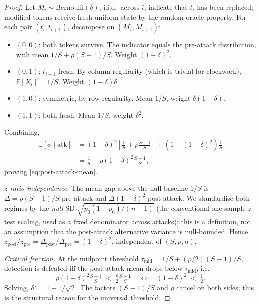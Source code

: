 \begin{proof}
  Let $M_i \sim \mathrm{Bernoulli}(\delta)$, i.i.d.\ across $i$,
  indicate that $t_i$ has been replaced; modified tokens receive
  fresh uniform state by the random-oracle property.  For each pair
  $(t_i, t_{i+1})$, decompose on $(M_i, M_{i+1})$:

  \begin{itemize}[nosep, leftmargin=1.2em]
    \item $(0,0)$: both tokens survive.  The indicator equals the
      pre-attack distribution, with mean $1/S + \rho (S{-}1)/S$.
      Weight $(1-\delta)^2$.
    \item $(0,1)$: $t_{i+1}$ fresh.  By column-regularity (which is
      trivial for clockwork), $\mathbb{E}[X_i] = 1/S$.  Weight
      $(1-\delta)\delta$.
    \item $(1,0)$: symmetric, by row-regularity.  Mean $1/S$, weight
      $\delta(1-\delta)$.
    \item $(1,1)$: both fresh.  Mean $1/S$, weight $\delta^2$.
  \end{itemize}
  Combining,
  \begin{align*}
    \mathbb{E}[\phi \mid \mathrm{atk}]
      &= (1-\delta)^2\!\left[\tfrac{1}{S} + \rho \tfrac{S-1}{S}\right]
        + (1 - (1-\delta)^2) \tfrac{1}{S} \\
      &= \tfrac{1}{S} + \rho (1-\delta)^2 \tfrac{S-1}{S},
  \end{align*}
  proving \eqref{eq:post-attack-mean}.


  \emph{$z$-ratio independence.}  The mean gap above the null
  baseline $1/S$ is $\Delta = \rho(S{-}1)/S$ pre-attack and $\Delta
  (1-\delta)^2$ post-attack. We standardise both regimes by the
  \emph{null} SD $\sqrt{p_0(1-p_0)/(n-1)}$ (the conventional
  one-sample $z$-test scaling, used as a fixed denominator across
  attacks); this is a definition, not an assumption that the
  post-attack alternative variance is null-bounded.  Hence
  $z_{\mathrm{post}}/z_{\mathrm{pre}} = \Delta_{\mathrm{post}} /
  \Delta_{\mathrm{pre}} = (1-\delta)^2$, independent of $(S, \rho, n)$.

  \emph{Critical fraction.}  At the midpoint threshold
  $\tau_{\mathrm{mid}} = 1/S + (\rho/2)(S{-}1)/S$, detection is
  defeated iff the post-attack mean drops below $\tau_{\mathrm{mid}}$,
  i.e.\
  \[
    \rho (1-\delta)^2 \tfrac{S-1}{S}
      \;<\; \tfrac{\rho}{2} \tfrac{S-1}{S}
    \quad\Longleftrightarrow\quad
    (1-\delta)^2 \;<\; \tfrac{1}{2}.
  \]
  Solving, $\delta^\star = 1 - 1/\sqrt{2}$.  The factors $(S{-}1)/S$
  and $\rho$ cancel on both sides; this is the structural reason for
  the universal threshold.
\end{proof}

